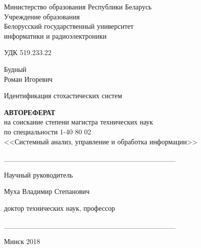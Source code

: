 \setlength{\parindent}{0mm}   %
{\centering
  Министерство образования Республики Беларусь \\
  Учреждение образования \\
  Белорусский государственный университет \\
  информатики и радиоэлектроники \\
}

\vspace{2\baselineskip}
УДК 519.233.22

\vspace{\baselineskip}
{\centering
  Будный \\ Роман Игоревич

  \vspace{5\baselineskip}
  Идентификация стохастических систем

  \bigskip
  \textbf{АВТОРЕФЕРАТ} \\
  на соискание степени магистра технических наук \\
  по специальности 1-40 80 02 \\
  <<Системный анализ, управление и обработка информации>> \\
}

\vspace{2\baselineskip}
\begin{minipage}{.45\linewidth}
\end{minipage}
\hfill
\begin{minipage}{.5\linewidth}
  \_\_\_\_\_\_\_\_\_\_\_\_\_\_\_\_\_\_\_\_\_\_\_\_\_\_\_\_\_\_\_\_\_

  \vspace{1.5\baselineskip}
  Научный руководитель

  \smallskip
  Муха Владимир Степанович

  \smallskip
  доктор технических наук, профессор

  \bigskip
  \_\_\_\_\_\_\_\_\_\_\_\_\_\_\_\_\_\_\_\_\_\_\_\_\_\_\_\_\_\_\_\_\_
\end{minipage}

\vfill
{\centering Минск 2018 \\}
\thispagestyle{empty}
\pagebreak
\setlength{\parindent}{1.25cm} %